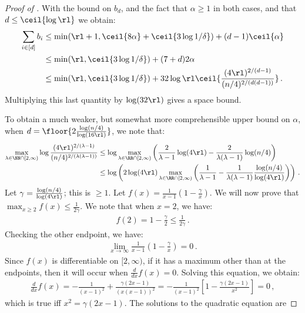 \begin{proof}[Proof of ]
  With the bound on $b_d$, and the fact that $\alpha \ge 1$ in both cases, and that $d \le \ceil{\log \rl}$ we obtain:
  \begin{align*}
    \sum_{i \in [d]} b_i &\le \min(\rl + 1, \ceil{8 \alpha} + \ceil{3 \log 1/\delta}) + (d - 1) \ceil{\alpha} \\
      &\le \min(\rl, \ceil{3 \log 1/\delta}) + (7 + d) 2 \alpha \\
      &\le \min(\rl, \ceil{3 \log 1/\delta}) + 32 \log \rl \ceil{\frac{(4 \rl)^{2/(d-1)}}{(n/4)^{2/(d(d-1))}}} \,.
  \end{align*}
  Multiplying this last quantity by $\log(32 \rl)$ gives a space bound.

  To obtain a much weaker, but somewhat more comprehensible upper bound on $\alpha$, when $d = \floor{2 \frac{\log(n/4)}{\log(16\rl)}}$, we note that:
  \begin{align*}
    \max_{\lambda \in \NN \cap [2,\infty)} \log \frac{(4 \rl)^{2/(\lambda-1)}}{(n/4)^{2/(\lambda(\lambda-1))}} &\le \log \max_{\lambda \in \RR \cap [2,\infty)} \left(\frac{2}{\lambda - 1} \log(4\rl) - \frac{2}{\lambda(\lambda-1)} \log(n/4) \right) \\
    &\le \log \left(2 \log(4\rl) \max_{\lambda \in \RR \cap [2,\infty)} \left(\frac{1}{\lambda - 1} - \frac{1}{\lambda (\lambda -1)} \frac{\log(n/4)}{\log(4\rl)} \right)\right) \,.
  \end{align*}
  Let $\gamma = \frac{\log(n/4)}{\log(4\rl)}$; this is $\ge 1$. Let $f(x) = \frac{1}{x - 1} (1 - \frac{\gamma}{x})$. We will now prove that $\max_{x \ge 2} f(x) \le \frac{1}{2\gamma}$. We note that when $x = 2$, we have:
  \begin{align*}
    f(2) = 1 - \frac{\gamma}{2} \le \frac{1}{2\gamma} \,.
  \end{align*}
  Checking the other endpoint, we have:
  \begin{align*}
    \lim_{x \rightarrow \infty} \frac{1}{x - 1} (1 - \frac{\gamma}{x}) = 0 \,.
  \end{align*}
  Since $f(x)$ is differentiable on $[2,\infty)$, if it has a maximum other than at the endpoints, then it will occur when $\frac{d}{dx} f(x) = 0$. Solving this equation, we obtain:
  \begin{align*}
    \frac{d}{dx} f(x) = -\frac{1}{\left(x-1\right)^{2}}+\frac{\gamma\left(2x-1\right)}{\left(x\left(x-1\right)\right)^{2}} = -\frac{1}{\left(x-1\right)^{2}}\left[1-\frac{\gamma\left(2x-1\right)}{x^{2}}\right] = 0 \,,
  \end{align*}
  which is true iff $x^2 = \gamma(2x - 1)$. The solutions to the quadratic equation are

\end{proof}
